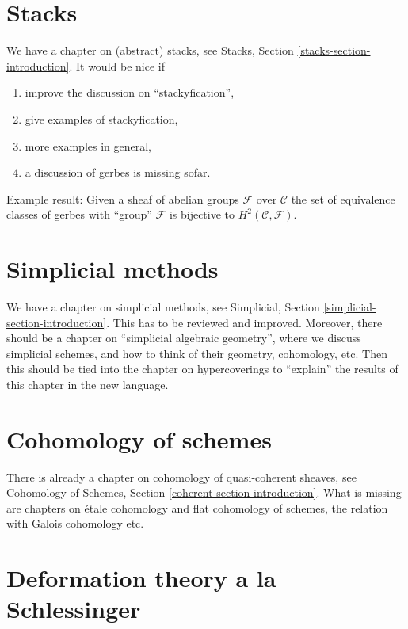 \section{Stacks}
\label{section-stacks}

\noindent
We have a chapter on (abstract) stacks, see
Stacks, Section \ref{stacks-section-introduction}.
It would be nice if
\begin{enumerate}
\item improve the discussion on ``stackyfication'',
\item give examples of stackyfication,
\item more examples in general,
\item a discussion of gerbes is missing sofar.
\end{enumerate}

\medskip\noindent
Example result: Given a sheaf of abelian groups $\mathcal{F}$
over $\mathcal{C}$ the set of equivalence classes of gerbes with ``group''
$\mathcal{F}$ is bijective to $H^2(\mathcal{C}, \mathcal{F})$.


\section{Simplicial methods}
\label{section-simplicial}

\noindent
We have a chapter on simplicial methods, see
Simplicial, Section \ref{simplicial-section-introduction}.
This has to be reviewed and improved. Moreover, there should be a
chapter on ``simplicial algebraic geometry'', where we discuss
simplicial schemes, and how to think of their geometry, cohomology,
etc. Then this should be tied into the chapter on hypercoverings
to ``explain'' the results of this chapter in the new language.


\section{Cohomology of schemes}
\label{section-schemes-cohomology}

\noindent
There is already a chapter on cohomology of quasi-coherent sheaves, see
Cohomology of Schemes, Section \ref{coherent-section-introduction}.
What is missing are chapters on \'etale cohomology and flat cohomology
of schemes, the relation with Galois cohomology etc.


\section{Deformation theory a la Schlessinger}
\label{section-deformation-schlessinger}

